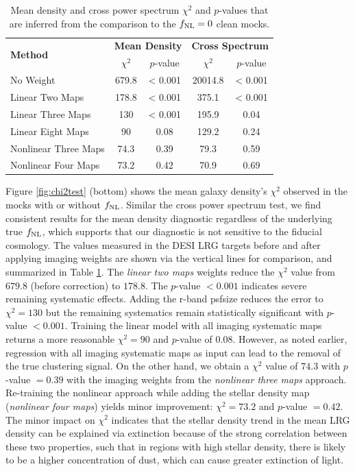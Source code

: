 \begin{table}
  \caption{Mean density and cross power spectrum $\chi^{2}$ and $p$-values that are inferred from the comparison to the $f_{\rm NL}=0$ clean mocks.}\label{tab:chi2test}
  \begin{tabular}{lcccc}
    \hline
    \hline
    \multirow{2}{*}{\textbf{Method}} &
      \multicolumn{2}{c}{\textbf{Mean Density}} &
      \multicolumn{2}{c}{\textbf{Cross Spectrum}} \\
    & $\chi^{2}$ & $p$-value & $\chi^{2}$ & $p$-value \\
    \hline
   No Weight & 679.8 & < 0.001 & 20014.8 & < 0.001 \\
   Linear Two Maps & 178.8 & < 0.001 & 375.1 & < 0.001\\
   Linear Three Maps & 130 & < 0.001 & 195.9 & 0.04\\
   Linear Eight Maps & 90 & 0.08 & 129.2 & 0.24\\
   Nonlinear Three Maps & 74.3 & 0.39  & 79.3 & 0.59\\
   Nonlinear Four Maps & 73.2 & 0.42 & 70.9 & 0.69\\    
    \hline
  \end{tabular}
\end{table}

Figure \ref{fig:chi2test} (bottom) shows the mean galaxy density's $\chi^{2}$ observed in the mocks with or without $f_{\rm NL}$. Similar  the cross power spectrum test, we find consistent results for the mean density diagnostic regardless of the underlying true $f_{\rm NL}$, which supports  that our diagnostic is not sensitive to the fiducial cosmology. The values measured in the DESI LRG targets before and after applying imaging weights are shown via the vertical lines for comparison, and summarized in Table \ref{tab:chi2test}. The \textit{linear two maps} weights reduce the $\chi^{2}$ value from $679.8$ (before correction) to $178.8$. The $p$-value $<0.001$ indicates severe remaining systematic effects. Adding the r-band psfsize reduces the error to $\chi^{2}=130$ but the remaining systematics remain statistically significant with $p$-value $<0.001$. Training the linear model with all imaging systematic maps returns a more reasonable $\chi^{2}=90$ and $p$-value of $0.08$. However, as noted earlier, regression with all imaging systematic maps as input can lead to the removal of the true clustering signal. On the other hand, we obtain a $\chi^{2}$ value of $74.3$ with $p$-value $=0.39$ with the imaging weights from the \textit{nonlinear three maps} approach. Re-training the nonlinear approach while adding the stellar density map (\textit{nonlinear four maps}) yields minor improvement: $\chi^{2}=73.2$ and $p$-value $=0.42$. The minor impact on $\chi^{2}$ indicates that the stellar density trend in the mean LRG density can be explained via extinction because of the strong correlation between these two properties, such that in regions with high stellar density, there is likely to be a higher concentration of dust, which can cause greater extinction of light.

